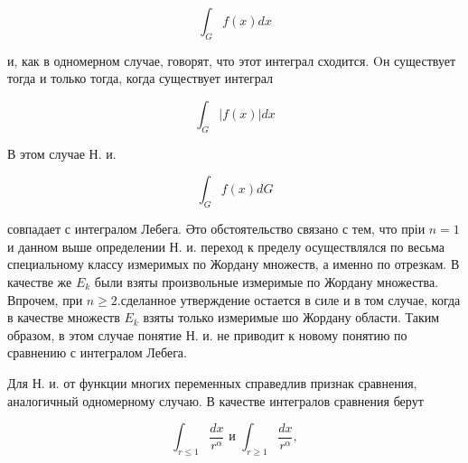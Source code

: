 \documentclass[10pt]{article}
\begin{document}
\[

\int_{G} f(x) d x

\]



и, как в одномерном случае, говорят, что этот интеграл сходится. Oн существует тогда и только тогда, когда существует интеграл



\[

\int_{G}|f(x)| d x

\]



В этом случае Н. и.



\[

\int_{G} f(x) d G

\]



совпадает с интегралом Лебега. Әто обстоятельство связано с тем, что пріи $n=1$ и данном выше определении Н. и. переход к пределу осуществлялся по весьма специальному классу измеримых по Жордану множеств, а именно по отрезкам. В качестве же $E_{k}$ были взяты произвольные измеримые по Жордану множества. Впрочем, при $n \geqslant 2$.сделанное утверждение остается в силе и в том случае, когда в качестве множеств $E_{k}$ взяты только измеримые шо Жордану области. Таким образом, в этом случае понятие Н. и. не приводит к новому понятию по сравнению с интегралом Лебега.



Для Н. и. от функции многих переменных справедлив признак сравнения, аналогичный одномерному случаю. В качестве интегралов сравнения берут



\[

\int_{r \leqslant 1} \frac{d x}{r^{\alpha}} \text { и } \int_{r \geqslant 1} \frac{d x}{r^{\alpha}},

\]
\end{document}
